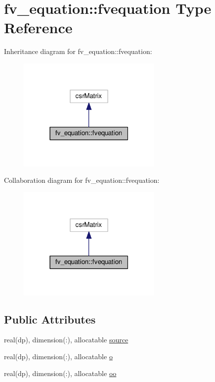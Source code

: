 \hypertarget{structfv__equation_1_1fvequation}{\section{fv\-\_\-equation\-:\-:fvequation Type Reference}
\label{structfv__equation_1_1fvequation}
}


Inheritance diagram for fv\-\_\-equation\-:\-:fvequation\-:\nopagebreak
\begin{figure}[H]
\begin{center}
\leavevmode
\includegraphics[width=198pt]{structfv__equation_1_1fvequation__inherit__graph}
\end{center}
\end{figure}


Collaboration diagram for fv\-\_\-equation\-:\-:fvequation\-:\nopagebreak
\begin{figure}[H]
\begin{center}
\leavevmode
\includegraphics[width=198pt]{structfv__equation_1_1fvequation__coll__graph}
\end{center}
\end{figure}
\subsection*{Public Attributes}
\begin{DoxyCompactItemize}
\item 
real(dp), dimension(\-:), allocatable \hyperlink{structfv__equation_1_1fvequation_a5e62f6aa9945885b4569e307c550f1f7}{source}
\item 
real(dp), dimension(\-:), allocatable \hyperlink{structfv__equation_1_1fvequation_ad6a75f5fc5341eeee3247dc71286bd24}{o}
\item 
real(dp), dimension(\-:), allocatable \hyperlink{structfv__equation_1_1fvequation_ab71f5aa786a1f668f5389e466db9ade8}{oo}
\end{DoxyCompactItemize}


